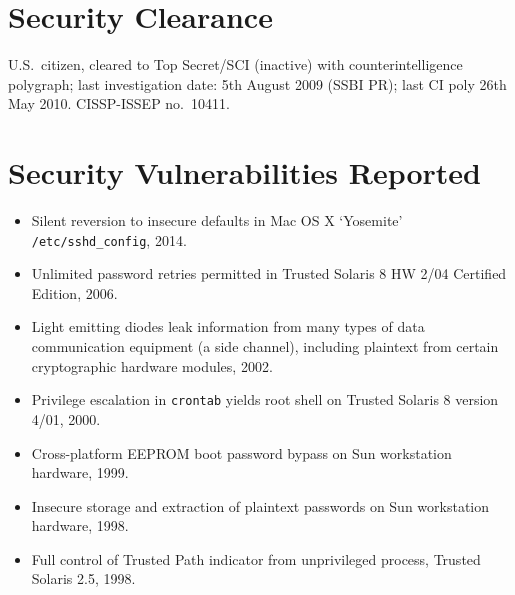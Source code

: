 \documentclass[12pt,twoside,letterpaper]{article}
\begin{document}
\vspace{-8mm}
\section*{Security Clearance}
\vspace{-2mm}

U.S.\ citizen, cleared to Top Secret/SCI (inactive) with
counterintelligence polygraph; last investigation date: 5th August 2009
(SSBI PR); last CI poly 26th May 2010. CISSP-ISSEP no.\ 10411.

\setlength{\fboxsep}{0pt}

\vspace{-5mm}
\section*{Security Vulnerabilities Reported}
\vspace{-2mm}

\begin{itemize}
    \item Silent reversion to insecure defaults in Mac OS X `Yosemite'
        \texttt{/etc/sshd\_config}, 2014.\vspace{-2.5mm}
	\item Unlimited password retries permitted in Trusted Solaris 8 HW 2/04
		Certified Edition, 2006.\vspace{-2.5mm}
	\item Light emitting diodes leak information from many types of data
		communication equipment (a side channel), including plaintext from
		certain cryptographic hardware modules, 2002.\vspace{-2.5mm}
	\item Privilege escalation in \verb,crontab, yields root shell on Trusted
		Solaris 8 version 4/01, 2000.\vspace{-2.5mm}
	\item Cross-platform EEPROM boot password bypass on Sun workstation
		hardware, 1999.\vspace{-2.5mm}
	\item Insecure storage and extraction of plaintext passwords on Sun workstation
		hardware, 1998.\vspace{-2.5mm}
	\item Full control of Trusted Path indicator from unprivileged process,
		Trusted Solaris 2.5, 1998.\vspace{-2.5mm}
\end{itemize}
\end{document}
